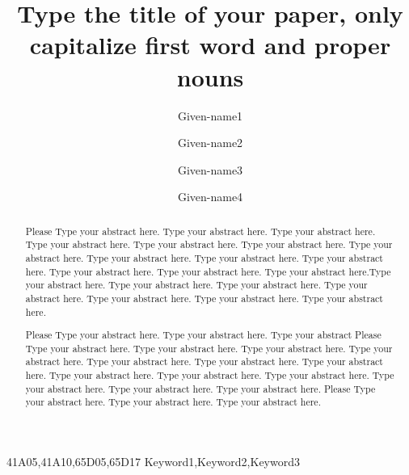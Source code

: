 \documentclass[times,twocolumn,final]{elsarticle}
\begin{document}

\begin{frontmatter}

\title{Type the title of your paper, only capitalize first
word and proper nouns}%

\author[1]{Given-name1 }
\author[1]{Given-name2 }
\author[2]{Given-name3 }
\author[2]{Given-name4 }

\address[1]{Affiliation 1, Address, City and Postal Code, Country}
\address[2]{Affiliation 2, Address, City and Postal Code, Country}



\begin{abstract}
Please Type your abstract here. Type your abstract here. Type your abstract
here. Type your abstract here. Type your abstract here. Type your
abstract here. Type your abstract here. Type your abstract here. Type
your abstract here. Type your abstract here. Type your abstract here.
Type your abstract here. Type your abstract here.Type your abstract here. 
Type your abstract here. Type your abstract here. Type your abstract here. 
Type your abstract here. Type your abstract here. Type your abstract here.

Please Type your abstract here. Type your abstract here. Type your abstract
Please Type your abstract here. Type your abstract here. Type your abstract
here. Type your abstract here. Type your abstract here. Type your
abstract here. Type your abstract here. Type your abstract here. Type
your abstract here. Type your abstract here. Type your abstract here.
Type your abstract here. Type your abstract here.
Please Type your abstract here. Type your abstract here. 
Type your abstract here.
\end{abstract}

\begin{keyword}
\MSC 41A05\sep 41A10\sep 65D05\sep 65D17
\KWD Keyword1\sep Keyword2\sep Keyword3
\end{keyword}

\end{frontmatter}
\end{document}

